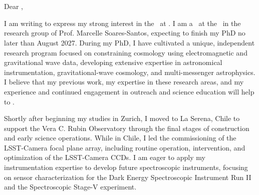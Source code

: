 \documentclass[10pt]{article}
\begin{document}
\begin{flushright}
\textbf{\ApplicantName}\\ 
\ApplicantInstitutionNameOne\\
\ApplicantInstitutionNameTwo\\
\ApplicantInstitutionAddressLine\\ \ApplicantInstitutionCityLine\\
\end{flushright}

\RecipientNameOne \hfill \LetterDate \\
\RecipientInstitution \\

Dear \RecipientNameTwo,

\vspace{0.25em}

I am writing to express my strong interest in the \PositionTitle\ at \RecipientInstitution. 
I am a \ApplicantTitle\ at the \ApplicantInstitutionNameTwo\ in the research group of Prof. Marcelle Soares-Santos, expecting to finish my PhD no later than August 2027.
During my PhD, I have cultivated a unique, independent research program focused on constraining cosmology using electromagnetic and gravitational wave data, developing extensive expertise in astronomical instrumentation, gravitational-wave cosmology, and multi-messenger astrophysics. I believe that my previous work, my expertise in these research areas, and my experience and continued engagement in outreach and science education will help to \HostGroupDescriptor.

Shortly after beginning my studies in Zurich, I moved to La Serena, Chile to support the Vera C. Rubin Observatory through the final stages of construction and early science operations.
While in Chile, I led the commissioning of the LSST-Camera focal plane array, including routine operation, intervention, and optimization of the LSST-Camera CCDs. 
\textcolor{\tcolor}{I am eager to apply my instrumentation expertise to develop future spectroscopic instruments, focusing on sensor characterization for the Dark Energy Spectroscopic Instrument Run II and the Spectroscopic Stage-V experiment.%
}
\end{document}
